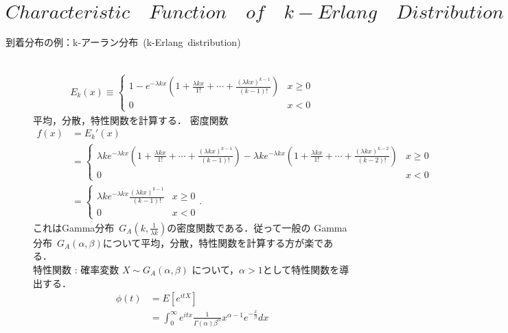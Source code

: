 \documentclass[a4j,papersize,disablejfam,slide,14pt]{jsarticle}
\def\exp#1{e^{#1}} %
\begin{document}
    

\section{$Characteristic\quad Function\quad of\quad k-Erlang\quad Distribution$}
\label{sec:appendix_erlang}
	\begin{description}
    	\item[到着分布の例：{\rm k-}アーラン分布\ {\rm (k-Erlang\ distribution)}]\mbox{}\\
    		\begin{align}
    			E_k(x) \equiv
        		\begin{cases}
        			1 - \exp{-\lambda k x} \left( 1 + \frac{\lambda k x}{1!} + \cdots + \frac{(\lambda k x)^{k-1}}{(k-1)!} \right) & \text{$x \geq 0$}\\
    				0 & \text{$x < 0$}
        		\end{cases}
    		\end{align}
        平均，分散，特性関数を計算する．
        密度関数
        \begin{align}
            f(x) &= E_k'(x) \\&= 
            \begin{cases}
        			\lambda k \exp{-\lambda k x} \left( 1 + \frac{\lambda k x}{1!} + \cdots + \frac{(\lambda k x)^{k-1}}{(k-1)!} \right)
                    - \lambda k \exp{-\lambda k x} \left( 1 + \frac{\lambda k x}{1!} + \cdots + \frac{(\lambda k x)^{k-2}}{(k-2)!} \right) & \text{$x \geq 0$}\\
    				0 & \text{$x < 0$}
        	\end{cases} 
            \\&=
            \begin{cases}
        			\lambda k \exp{-\lambda k x} \frac{(\lambda k x)^{k-1}}{(k-1)!} & \text{$x \geq 0$}\\
    				0 & \text{$x < 0$}
        	\end{cases}.
        \end{align}
        これは{\rm Gamma}分布\ $G_A(k, \frac{1}{\lambda k})$の密度関数である．従って一般の
        {\rm Gamma}分布\ $G_A(\alpha, \beta)$について平均，分散，特性関数を計算する方が楽である．\\
        特性関数 : 確率変数 $X \sim G_A(\alpha, \beta)$ について，$\alpha > 1$として特性関数を導出する．
        \begin{align}
			\phi(t) &= E[e^{itX}] \\
			&= \int_{0}^{\infty} e^{itx} \frac{1}{\Gamma(\alpha)\beta^\alpha} x^{\alpha-1} e^{-\frac{x}{\beta}} dx \\

\end{align}
\end{description}
\end{document}
